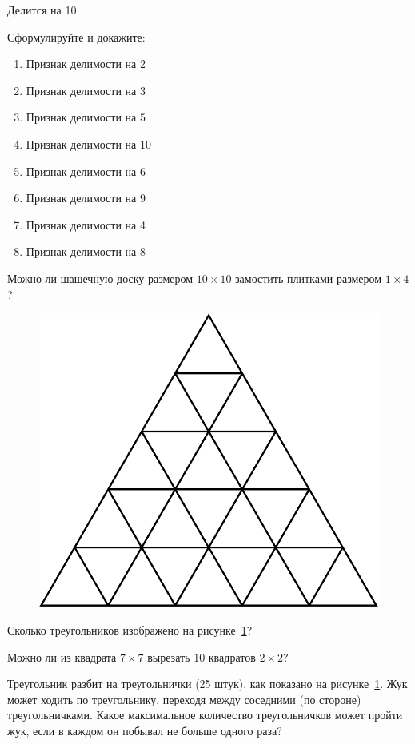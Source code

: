 \documentclass{article}
\begin{document}
\begin{enumerate_boxed}
        Делится на 10

        \item Сформулируйте и докажите:

        \begin{enumerate}
            \item Признак делимости на 2

            \item Признак делимости на 3

            \item Признак делимости на 5

            \item Признак делимости на 10

            \item Признак делимости на 6

            \item Признак делимости на 9

            \item Признак делимости на 4

            \item Признак делимости на 8
        \end{enumerate}

        \item Можно ли шашечную доску размером $10 \times 10$ замостить плитками размером $1 \times 4$?

        \begin{figure}[h]
            \centering
            \includegraphics[width=0.3\linewidth]{triangle2}
            \caption{}
            \label{fig:triangle2}
        \end{figure}

        \item Сколько треугольников изображено на рисунке~\ref{fig:triangle2}?

        \item Можно ли из квадрата $7\times 7$ вырезать 10 квадратов $2\times2$?

        \item Треугольник разбит на треугольнички (25 штук), как показано на рисунке~\ref{fig:triangle2}.
        Жук может ходить по треугольнику, переходя между соседними (по стороне) треугольничками.
        Какое максимальное количество треугольничков может пройти жук, если в каждом он побывал не больше одного раза?


\end{enumerate_boxed}
\end{document}
